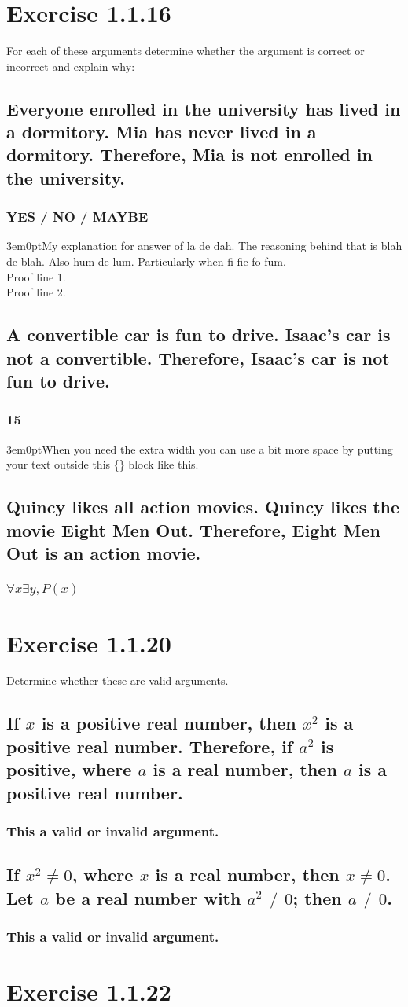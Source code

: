 \documentclass[letter]{article}
\newcommand{\problemnumber}[1] {\filbreak\section{#1}}
\newcommand{\question}[1] {\subsection{#1}}
\newcommand{\answer}[1] {\subsubsection{#1}}
\newcommand{\explanation}[1] {\begin{adjustwidth}{3em}{0pt}#1\end{adjustwidth}}
\begin{document}
\problemnumber{Exercise 1.1.16}{For each of these arguments determine whether the argument is correct or incorrect and explain why:}

\question{Everyone enrolled in the university has lived in a dormitory.
Mia has never lived in a dormitory. Therefore,
Mia is not enrolled in the university.}
\answer{YES / NO / MAYBE}
\explanation{My explanation for answer of la de dah. The reasoning behind that is blah de blah. Also hum de lum. Particularly when fi fie fo fum.\\Proof line 1.\\ Proof line 2.}

\question{A convertible car is fun to drive. Isaac’s car is not a
convertible. Therefore, Isaac’s car is not fun to drive.}
\answer{15}
\explanation{When you need the extra width you can use a bit more space by putting your text outside this \{\} block like this.}

\question{Quincy likes all action movies. Quincy likes the
movie Eight Men Out. Therefore, Eight Men Out is
an action movie.}
\answer{$\forall x \exists y , P(x)$}

\problemnumber{Exercise 1.1.20}{Determine whether these are valid arguments.}

\question{If $x$ is a positive real number, then $x^2$ is a positive real
number. Therefore, if $a^2$ is positive, where $a$ is a real
number, then $a$ is a positive real number.}
\answer{This a valid or invalid argument.}

\question{If $x^2 \neq 0$, where $x$ is a real number, then $x \neq 0$. Let $a$
be a real number with $a^2 \neq 0$; then $a \neq 0$.}
\answer{This a valid or invalid argument.}

\problemnumber{Exercise 1.1.22}
\end{document}
